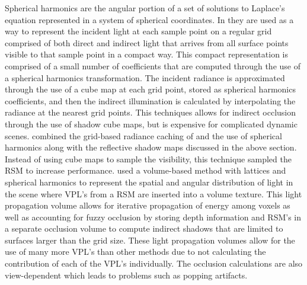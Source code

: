 Spherical harmonics are the angular portion of a set of solutions to Laplace's equation represented in a system of spherical coordinates.  In \cite{Nijasure2005} they are used as a way to represent the incident light at each sample point on a regular grid comprised of both direct and indirect light that arrives from all surface points visible to that sample point in a compact way.  This compact representation is comprised of a small number of coefficients that are computed through the use of a spherical harmonics transformation.  The incident radiance is approximated through the use of a cube map at each grid point, stored as spherical harmonics coefficients, and then the indirect illumination is calculated by interpolating the radiance at the nearest grid points.  This techniques allows for indirect occlusion through the use of shadow cube maps, but is expensive for complicated dynamic scenes.  \cite{Papaioannou2011} combined the grid-based radiance caching of \cite{Nijasure2005} and the use of spherical harmonics along with the reflective shadow maps discussed in the above section.  Instead of using cube maps to sample the visibility, this technique sampled the RSM to increase performance.  \cite{Kaplanyan2010} used a volume-based method with lattices and spherical harmonics to represent the spatial and angular distribution of light in the scene where VPL's from a RSM are inserted into a volume texture.  This light propagation volume allows for iterative propagation of energy among voxels as well as accounting for fuzzy occlusion by storing depth information and RSM's in a separate occlusion volume to compute indirect shadows that are limited to surfaces larger than the grid size.  These light propagation volumes allow for the use of many more VPL's than other methods due to not calculating the contribution of each of the VPL's individually.  The occlusion calculations are also view-dependent which leads to problems such as popping artifacts.